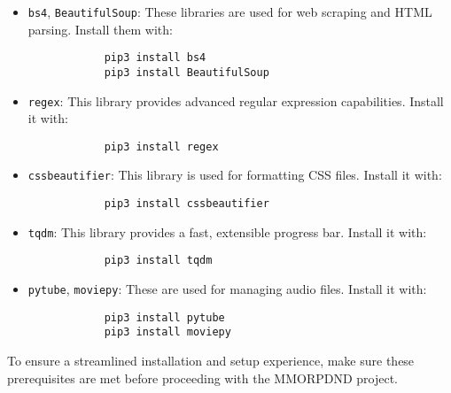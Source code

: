 \begin{itemize}
	\begin{itemize}
		\item \texttt{bs4}, \texttt{BeautifulSoup}: These libraries are used for web scraping and HTML parsing. Install them with:
		
		\begin{verbatim}
			pip3 install bs4
			pip3 install BeautifulSoup
		\end{verbatim}
		
		\item \texttt{regex}: This library provides advanced regular expression capabilities. Install it with:
		
		\begin{verbatim}
			pip3 install regex
		\end{verbatim}
		
		\item \texttt{cssbeautifier}: This library is used for formatting CSS files. Install it with:
		
		\begin{verbatim}
			pip3 install cssbeautifier
		\end{verbatim}
		
		\item \texttt{tqdm}: This library provides a fast, extensible progress bar. Install it with:
		
		\begin{verbatim}
			pip3 install tqdm
		\end{verbatim}

  		\item \texttt{pytube}, \texttt{moviepy}: These are used for managing audio files. Install it with:		
    
		\begin{verbatim}
			pip3 install pytube
			pip3 install moviepy
		\end{verbatim}
	\end{itemize}
\end{itemize}

To ensure a streamlined installation and setup experience, make sure these prerequisites are met before proceeding with the MMORPDND project.
